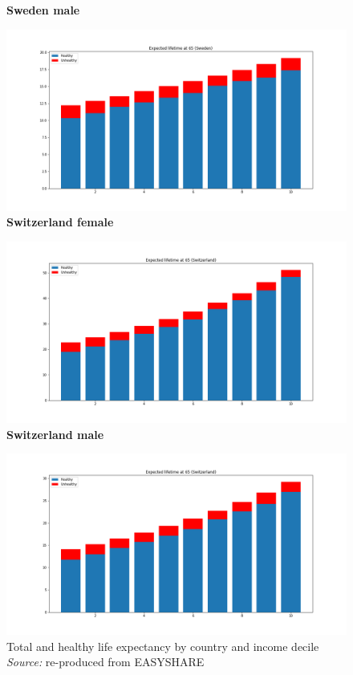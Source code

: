\begin{figure}[H]
 \endminipage\hfill
{}
\centering \textbf{Sweden male}\par\medskip
  \includegraphics[width=\linewidth]{images/new_results/Sweden_1_m.png}
\endminipage\hfill
{}
\centering \textbf{Switzerland female}\par\medskip
  \includegraphics[width=\linewidth]{images/new_results/Switzerland_1_f.png}
 \endminipage\hfill
{}
\centering \textbf{Switzerland male}\par\medskip
  \includegraphics[width=\linewidth]{images/new_results/Switzerland_1_m.png}
\endminipage\hfill
\captionsetup{justification=centering}
\caption{Total and healthy life expectancy by country and income decile \\ \textit{Source:} re-produced from EASYSHARE}
\end{figure}























